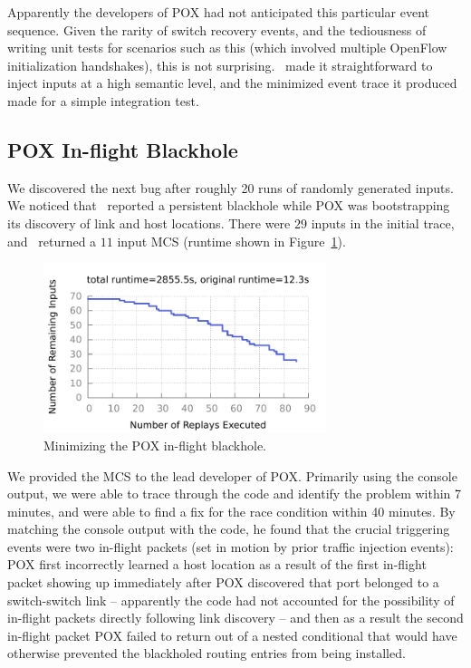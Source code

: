 Apparently the developers of POX had not anticipated this particular event
sequence. Given the rarity of switch recovery events, and the tediousness of
writing unit tests for scenarios such as this
(which involved multiple OpenFlow initialization handshakes), this is not
surprising.
\projectname~made it straightforward to inject inputs
at a high semantic level,
and the minimized event
trace it produced made for a simple integration test.


\subsection{POX In-flight Blackhole}
We discovered the next bug after roughly 20 runs of randomly generated inputs.
We noticed that \projectname~reported a persistent blackhole while POX was bootstrapping its
discovery of link and host locations. There were $29$ inputs in the initial trace, and \simulator~returned a $11$ input
MCS (runtime shown in Figure~\ref{fig:pox_discovery}).

\begin{figure}[t]
    \includegraphics[width=3.25in]{../graphs/runtime/pox_blackhole.pdf}
    \caption[]{\label{fig:pox_discovery} Minimizing the POX in-flight blackhole.}
\end{figure}

We provided the MCS to the lead developer of POX. Primarily using the
console output, we were able to trace through the code and identify the problem
within 7 minutes, and were able to find a fix for the race condition within 40
minutes. By matching the console output with the code, he found that the crucial
triggering events were two
in-flight packets (set in motion by prior traffic injection events):
POX first incorrectly learned a host location as a result of the first in-flight
packet showing up immediately after POX discovered that port belonged to
a switch-switch link -- apparently the code had not accounted for the
possibility of in-flight packets directly following link discovery -- and
then as a result the
second in-flight packet
POX failed to return out of a nested conditional that would have
otherwise prevented the blackholed routing entries from being installed.

